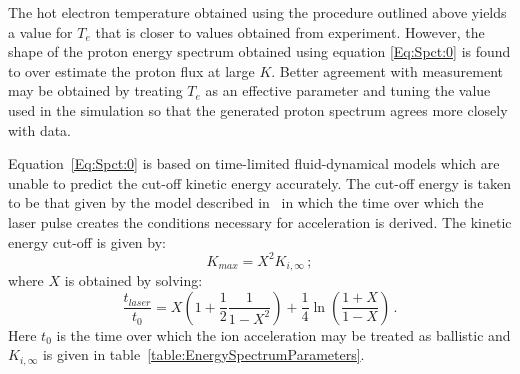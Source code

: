 The hot electron temperature obtained using the procedure outlined
above yields a value for $T_e$ that is closer to values obtained from
experiment.
However, the shape of the proton energy spectrum obtained using
equation \ref{Eq:Spct:0} is found to over estimate the proton flux at
large $K$.
Better agreement with measurement may be obtained by treating $T_e$ as
an effective parameter and tuning the value used in the simulation so
that the generated proton spectrum agrees more closely with data.

Equation~\ref{Eq:Spct:0} is based on time-limited fluid-dynamical
models which are unable to predict the cut-off kinetic energy
accurately. 
The cut-off energy is taken to be that given by the model described
in~\cite{10.1103/PhysRevLett.97.045005} in which the time over which
the laser pulse creates the conditions necessary for acceleration is
derived.
The kinetic energy cut-off is given by:
\begin{equation}
  K_{max} = X^{2} K_{i,\infty} \, ;
  \label{eq:Eq:Spct:2}
\end{equation}
where $X$ is obtained by solving:
\begin{equation}
  \frac{t_{laser}}{t_{0}} = X \left( 1 + \frac{1}{2}
                           \frac{1}{1 - X^{2}} \right) +
                           \frac{1}{4} \ln \left( \frac{1+X}{1-X} \right) \, .
  \label{eq:Eq:Spct:1}
\end{equation}
Here $t_0$ is the time over which the ion acceleration may be treated
as ballistic and $K_{i,\infty}$ is given in
table~\ref{table:EnergySpectrumParameters}.

